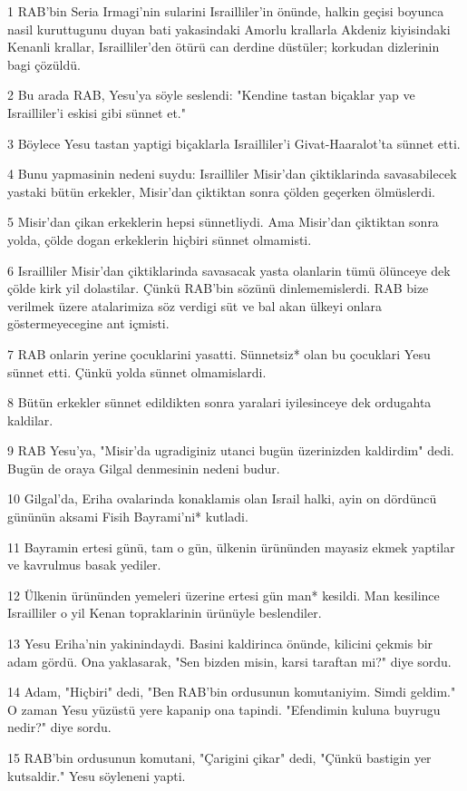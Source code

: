 \par 1 RAB'bin Seria Irmagi'nin sularini Israilliler'in önünde, halkin geçisi boyunca nasil kuruttugunu duyan bati yakasindaki Amorlu krallarla Akdeniz kiyisindaki Kenanli krallar, Israilliler'den ötürü can derdine düstüler; korkudan dizlerinin bagi çözüldü.
\par 2 Bu arada RAB, Yesu'ya söyle seslendi: "Kendine tastan biçaklar yap ve Israilliler'i eskisi gibi sünnet et."
\par 3 Böylece Yesu tastan yaptigi biçaklarla Israilliler'i Givat-Haaralot'ta sünnet etti.
\par 4 Bunu yapmasinin nedeni suydu: Israilliler Misir'dan çiktiklarinda savasabilecek yastaki bütün erkekler, Misir'dan çiktiktan sonra çölden geçerken ölmüslerdi.
\par 5 Misir'dan çikan erkeklerin hepsi sünnetliydi. Ama Misir'dan çiktiktan sonra yolda, çölde dogan erkeklerin hiçbiri sünnet olmamisti.
\par 6 Israilliler Misir'dan çiktiklarinda savasacak yasta olanlarin tümü ölünceye dek çölde kirk yil dolastilar. Çünkü RAB'bin sözünü dinlememislerdi. RAB bize verilmek üzere atalarimiza söz verdigi süt ve bal akan ülkeyi onlara göstermeyecegine ant içmisti.
\par 7 RAB onlarin yerine çocuklarini yasatti. Sünnetsiz* olan bu çocuklari Yesu sünnet etti. Çünkü yolda sünnet olmamislardi.
\par 8 Bütün erkekler sünnet edildikten sonra yaralari iyilesinceye dek ordugahta kaldilar.
\par 9 RAB Yesu'ya, "Misir'da ugradiginiz utanci bugün üzerinizden kaldirdim" dedi. Bugün de oraya Gilgal denmesinin nedeni budur.
\par 10 Gilgal'da, Eriha ovalarinda konaklamis olan Israil halki, ayin on dördüncü gününün aksami Fisih Bayrami'ni* kutladi.
\par 11 Bayramin ertesi günü, tam o gün, ülkenin ürününden mayasiz ekmek yaptilar ve kavrulmus basak yediler.
\par 12 Ülkenin ürününden yemeleri üzerine ertesi gün man* kesildi. Man kesilince Israilliler o yil Kenan topraklarinin ürünüyle beslendiler.
\par 13 Yesu Eriha'nin yakinindaydi. Basini kaldirinca önünde, kilicini çekmis bir adam gördü. Ona yaklasarak, "Sen bizden misin, karsi taraftan mi?" diye sordu.
\par 14 Adam, "Hiçbiri" dedi, "Ben RAB'bin ordusunun komutaniyim. Simdi geldim." O zaman Yesu yüzüstü yere kapanip ona tapindi. "Efendimin kuluna buyrugu nedir?" diye sordu.
\par 15 RAB'bin ordusunun komutani, "Çarigini çikar" dedi, "Çünkü bastigin yer kutsaldir." Yesu söyleneni yapti.

